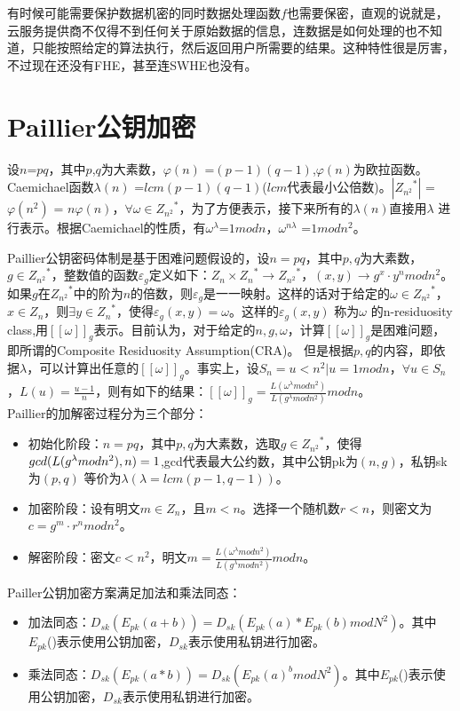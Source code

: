 有时候可能需要保护数据机密的同时数据处理函数$f$也需要保密，直观的说就是，云服务提供商不仅得不到任何关于原始数据的信息，连数据是如何处理的也不知道，只能按照给定的算法执行，然后返回用户所需要的结果。这种特性很是厉害，不过现在还没有FHE，甚至连SWHE也没有。
\section{Paillier公钥加密}
设$n$=$pq$，其中$p$,$q$为大素数，$\varphi(n)$ =$(p-1)(q-1)$,$\varphi(n)$为欧拉函数。Caemichael函数$\lambda(n)$ =$lcm(p-1)(q-1)$($lcm$代表最小公倍数)。$|{Z_{n^2}}^*|$ =$\varphi({n}^2)$ = $n\varphi(n)$，$\forall \omega \in {Z_{n^2}}^*$，为了方便表示，接下来所有的$\lambda(n)$直接用$\lambda$ 进行表示。根据Caemichael的性质，有${\omega}^\lambda$=$1 mod n$，${\omega}^{n\lambda}$ =$1 mod {n}^2$。

Paillier公钥密码体制是基于困难问题假设的，设$n=pq$，其中$p,q$为大素数，$g \in {Z_{n^2}}^*$，整数值的函数$\varepsilon_g$定义如下：$Z_n\times {Z_n}^* \rightarrow {Z_{n^2}}^* $，$(x,y) \rightarrow {g}^x \cdot {y}^n mod {n}^2$。如果$g$在${Z_{n^2}}^*$中的阶为$n$的倍数，则$\varepsilon_g$是一一映射。这样的话对于给定的$\omega \in {Z_{n^2}}^*$，$x \in Z_n$，则$\exists y \in {Z_n}^*$，使得$\varepsilon_g(x,y) = \omega$。这样的$\varepsilon_g (x,y)$ 称为$\omega$ 的n-residuosity class,用$[[\omega]]_g$表示。目前认为，对于给定的$n,g,\omega$，计算$[[\omega]]_g$是困难问题，即所谓的Composite Residuosity Assumption(CRA)。 但是根据$p,q$的内容，即依据$\lambda$，可以计算出任意的$[[\omega]]_g$。事实上，设$S_n={u<{n}^2 | u =1 mod n}$，$\forall u \in S_n$，$L(u)= \frac{u-1}{n} $，则有如下的结果：$[[\omega]]_g= \frac{L({\omega}^\lambda mod {n}^2)}{L({g}^\lambda mod {n}^2)} mod n$。\\
Paillier的加解密过程分为三个部分：
\begin{itemize}
\item 初始化阶段：$n=pq$，其中$p,q$为大素数，选取$g \in {Z_{n^2}}^* $，使得$gcd(L({g}^\lambda mod {n}^2)\\,n)=1$,gcd代表最大公约数，其中公钥pk为$(n,g)$，私钥sk为$(p,q)$ 等价为$\lambda(\lambda=lcm(p-1,q-1))$。
\item 加密阶段：设有明文$m \in Z_n$，且$m<n$。选择一个随机数$r<n$，则密文为$c={g}^m\cdot {r}^n mod {n}^2$。
\item 解密阶段：密文$c<{n}^2$，明文$m=\frac{L({\omega}^\lambda mod {n}^2)}{L({g}^\lambda mod {n}^2)} mod n$。

\end{itemize}
Pailler公钥加密方案满足加法和乘法同态：
\begin{itemize}
\item 加法同态：$D_{sk}(E_{pk}(a+b)) = D_{sk}(E_{pk}(a)*E_{pk}(b)mod {N}^2)$。其中$E_{pk}$()表示使用公钥加密，$D_{sk}$表示使用私钥进行加密。
\item 乘法同态：$D_{sk}(E_{pk}(a*b)) = D_{sk}(E_{pk}(a)^b mod N^2)$。其中$E_{pk}$()表示使用公钥加密，$D_{sk}$表示使用私钥进行加密。
\end{itemize}
